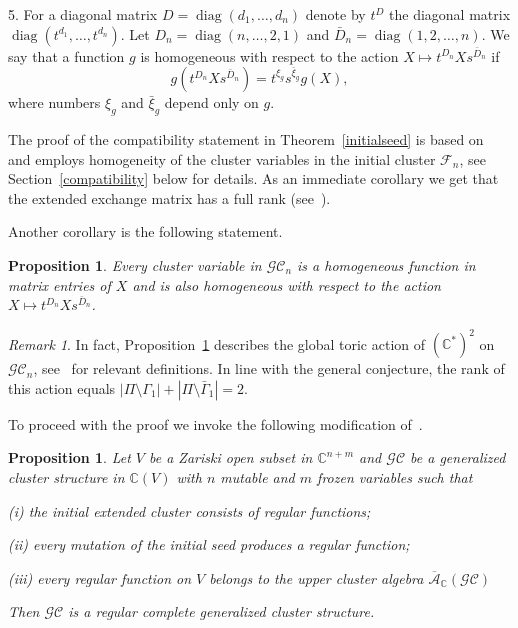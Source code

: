 \documentclass{amsart}
\newtheorem{proposition}[theorem]{Proposition}
\theoremstyle{definition}
\theoremstyle{remark}
\newtheorem{remark}[theorem]{Remark}
\numberwithin{equation}{section}
\numberwithin{theorem}{section}
\def\A{{\mathcal A}}
\def\C{{\mathbb C}}
\def\CC{{\mathcal C}}
\def\FF{{\mathcal F}}
\def\G{{\mathcal G}}
\def\UC{\overline{\A}}
\def\diag{\operatorname{diag}}
\begin{document}
5. For a diagonal matrix $D=\diag(d_1,\dots,d_n)$ denote by $t^D$ the diagonal matrix $\diag(t^{d_1},\dots,t^{d_n})$.
Let $D_n=\diag(n,\dots,2,1)$ and $\bar D_n=\diag(1,2,\dots,n)$.
We say that a function $g$ is homogeneous with respect to the action $X \mapsto t^{ D_n} X s^{\bar D_n}$ if
\begin{equation}
\label{eq:T-hom}
g(t^{D_n} X s^{\bar D_n}) = t^{\xi_g} s^{\bar\xi_g} g(X),
\end{equation}
where numbers $\xi_g$ and $\bar\xi_g$ depend only on $g$. 

The proof of the compatibility statement in Theorem~\ref{initialseed} is based 
on~\cite[Proposition~2.1]{GSVnewdouble} and employs homogeneity of the cluster variables in the initial cluster 
$\FF_n$, see Section~\ref{compatibility} below for details. As an immediate corollary we get that the extended exchange matrix has a full rank (see~\cite[Proposition~2.5]{GSVdouble}). 

Another corollary is the following statement.

\begin{proposition}
\label{prop:torus}
Every cluster variable in $\G\CC_{n}$ is a homogeneous function in matrix entries of $X$ and is also homogeneous with respect to the action $X \mapsto t^{D_n} X s^{\bar D_n}$.
\end{proposition}

 
\begin{remark} In fact, Proposition~\ref{prop:torus} describes the global toric action of $(\C^*)^2$ on $\G\CC_n$, 
see~\cite[Section 2.1]{GSVdouble} for relevant definitions. In line with the general conjecture, the rank of this action equals $|\Pi\setminus\Gamma_1|+ |\Pi\setminus\bar\Gamma_1|=2$.
\end{remark}


To proceed with the proof we invoke the following modification of~\cite[Proposition 2.1]{GSVMem}.

\begin{proposition}\label{regcomplete}
Let $V$ be a Zariski open subset in $\C^{n+m}$ and $\G\CC$ be a generalized cluster structure in $\C(V)$ with
$n$ mutable and $m$ frozen variables such that

{\rm (i)} the initial extended cluster consists of regular functions;

{\rm (ii)} every mutation of the initial seed produces a regular function;

{\rm (iii)} every regular function on $V$ belongs to the upper cluster algebra $\UC_\C(\G\CC)$

Then $\G\CC$ is a regular complete generalized cluster structure. 
\end{proposition}
\end{document}
